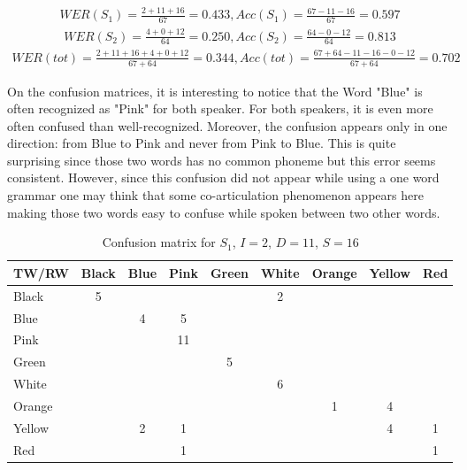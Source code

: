 \begin{align*}
WER(S_1) = \frac{2 + 11 +16}{67} = 0.433, Acc(S_1) = \frac{67-11-16}{67} = 0.597
\end{align*}
\begin{align*}
WER(S_2) = \frac{4 + 0 + 12}{64} = 0.250, Acc(S_2) = \frac{64-0-12}{64} = 0.813 
\end{align*}
\begin{align*}
WER(tot) = \frac{2 + 11 +16 +4 +0 +12}{67+64} = 0.344, Acc(tot) = \frac{67 + 64 -11-16 - 0 -12}{67 + 64} = 0.702 
\end{align*}

On the confusion matrices, it is interesting to notice that the Word "Blue" is often recognized as "Pink" for both speaker. For both speakers, it is even more often confused than well-recognized. Moreover, the confusion appears only in one direction: from Blue to Pink and never from Pink to Blue. This is quite surprising since those two words has no common phoneme but this error seems consistent. However, since this confusion did not appear while using a one word grammar one may think that some co-articulation phenomenon appears here making those two words easy to confuse while spoken between two other words. 

\begin{table}[h!]
  \begin{tabular}{|l|*{8}{c|}}
\hline
 TW/RW  & Black & Blue & Pink & Green & White & Orange & Yellow & Red \\
\hline
Black &	5 & & & & 2 & & &  \\
\hline	
Blue  &	& 4 & 5 & & & & & \\
\hline
Pink  & & & 11 & & & & & \\
\hline					
Green & & & & 5 & & & & \\
\hline
White & & & & & 6 & & & \\
\hline
Orange & & & & & & 1 & 4 & 	\\
\hline
Yellow & & 2 & 1 & & & & 4 & 1 	\\
\hline
Red & & & 1 & & & & & 1 \\
\hline
  \end{tabular}
\caption{Confusion matrix for $S_1$, $I = 2$, $D = 11$, $S=16$}
\label{tad:david_result}
\end{table}

